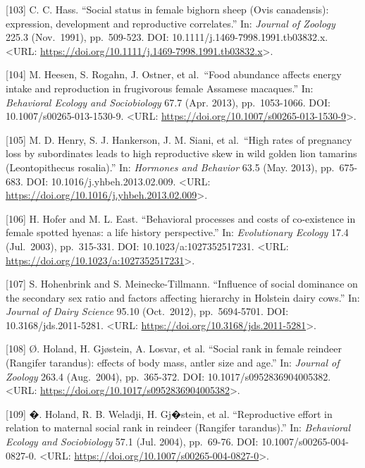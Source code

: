 \documentclass[
]{article}
\begin{document}
{[}103{]} C. C. Hass. ``Social status in female bighorn sheep (Ovis
canadensis): expression, development and reproductive correlates.'' In:
\emph{Journal of Zoology} 225.3 (Nov.~1991), pp.~509-523. DOI:
10.1111/j.1469-7998.1991.tb03832.x. \textless URL:
\url{https://doi.org/10.1111/j.1469-7998.1991.tb03832.x}\textgreater.

{[}104{]} M. Heesen, S. Rogahn, J. Ostner, et al.~``Food abundance
affects energy intake and reproduction in frugivorous female Assamese
macaques.'' In: \emph{Behavioral Ecology and Sociobiology} 67.7 (Apr.
2013), pp.~1053-1066. DOI: 10.1007/s00265-013-1530-9. \textless URL:
\url{https://doi.org/10.1007/s00265-013-1530-9}\textgreater.

{[}105{]} M. D. Henry, S. J. Hankerson, J. M. Siani, et al.~``High rates
of pregnancy loss by subordinates leads to high reproductive skew in
wild golden lion tamarins (Leontopithecus rosalia).'' In: \emph{Hormones
and Behavior} 63.5 (May. 2013), pp.~675-683. DOI:
10.1016/j.yhbeh.2013.02.009. \textless URL:
\url{https://doi.org/10.1016/j.yhbeh.2013.02.009}\textgreater.

{[}106{]} H. Hofer and M. L. East. ``Behavioral processes and costs of
co-existence in female spotted hyenas: a life history perspective.'' In:
\emph{Evolutionary Ecology} 17.4 (Jul.~2003), pp.~315-331. DOI:
10.1023/a:1027352517231. \textless URL:
\url{https://doi.org/10.1023/a:1027352517231}\textgreater.

{[}107{]} S. Hohenbrink and S. Meinecke-Tillmann. ``Influence of social
dominance on the secondary sex ratio and factors affecting hierarchy in
Holstein dairy cows.'' In: \emph{Journal of Dairy Science} 95.10
(Oct.~2012), pp.~5694-5701. DOI: 10.3168/jds.2011-5281. \textless URL:
\url{https://doi.org/10.3168/jds.2011-5281}\textgreater.

{[}108{]} Ø. Holand, H. Gjøstein, A. Losvar, et al. ``Social rank in
female reindeer (Rangifer tarandus): effects of body mass, antler size
and age.'' In: \emph{Journal of Zoology} 263.4 (Aug.~2004), pp.~365-372.
DOI: 10.1017/s0952836904005382. \textless URL:
\url{https://doi.org/10.1017/s0952836904005382}\textgreater.

{[}109{]} �. Holand, R. B. Weladji, H. Gj�stein, et al. ``Reproductive
effort in relation to maternal social rank in reindeer (Rangifer
tarandus).'' In: \emph{Behavioral Ecology and Sociobiology} 57.1 (Jul.
2004), pp.~69-76. DOI: 10.1007/s00265-004-0827-0. \textless URL:
\url{https://doi.org/10.1007/s00265-004-0827-0}\textgreater.
\end{document}
